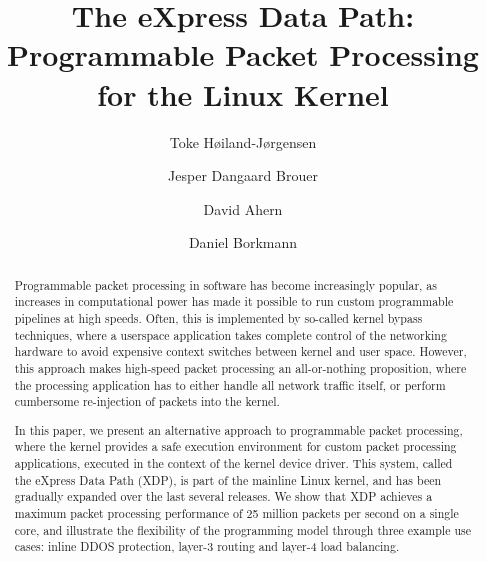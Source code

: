 \documentclass[10pt,sigconf]{acmart}
\begin{document}
\title{The eXpress Data Path: Programmable Packet Processing for the Linux Kernel}
\author{Toke Høiland-Jørgensen}

\author{Jesper Dangaard Brouer}

\author{David Ahern}

\author{Daniel Borkmann}

\renewcommand{\shortauthors}{T. Høiland-Jørgensen et al.}
\renewcommand{\shorttitle}{The eXpress Data Path}
\captionsetup{font+=small}



\begin{abstract}
  Programmable packet processing in software has become increasingly popular, as
  increases in computational power has made it possible to run custom
  programmable pipelines at high speeds. Often, this is implemented by so-called
  kernel bypass techniques, where a userspace application takes complete control
  of the networking hardware to avoid expensive context switches between kernel
  and user space. However, this approach makes high-speed packet processing an
  all-or-nothing proposition, where the processing application has to either
  handle all network traffic itself, or perform cumbersome re-injection of
  packets into the kernel.

  In this paper, we present an alternative approach to programmable packet
  processing, where the kernel provides a safe execution environment for custom
  packet processing applications, executed in the context of the kernel device
  driver. This system, called the eXpress Data Path (XDP), is part of the
  mainline Linux kernel, and has been gradually expanded over the last several
  releases. We show that XDP achieves a maximum packet processing performance of
  25 million packets per second on a single core, and illustrate the flexibility
  of the programming model through three example use cases: inline DDOS
  protection, layer-3 routing and layer-4 load balancing.
\end{abstract}


\maketitle
\end{document}
